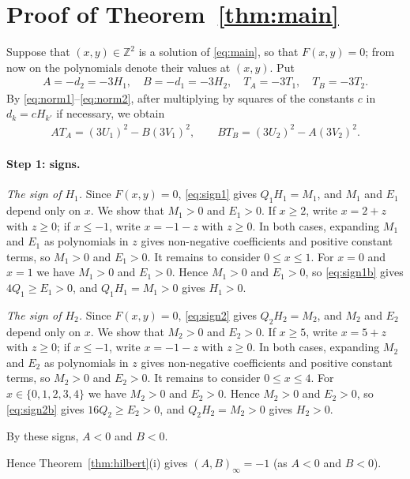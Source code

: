 \documentclass[11pt]{article}
\newcommand{\Z}{\mathbb{Z}}
\begin{document}
\section{Proof of Theorem~\ref{thm:main}}

Suppose that $(x,y)\in\Z^2$ is a solution of \eqref{eq:main}, so that $F(x,y)=0$; from now on the polynomials denote their values at $(x,y)$. Put
\begin{gather*}
A=-d_{2}=-3H_{1},\quad B=-d_{1}=-3H_{2},\quad T_A=-3T_{1},\quad T_B=-3T_{2}.
\end{gather*}
By \eqref{eq:norm1}--\eqref{eq:norm2}, after multiplying by squares of the constants $c$ in $d_k=cH_{k'}$ if necessary, we obtain
\begin{align}
AT_A=(3U_{1})^2-B(3V_{1})^2,\qquad BT_B=(3U_{2})^2-A(3V_{2})^2.\label{eq:AB}
\end{align}

\paragraph{Step 1: signs.} \emph{The sign of $H_{1}$.} Since $F(x,y)=0$, \eqref{eq:sign1} gives $Q_{1}H_{1}=M_{1}$, and $M_{1}$ and $E_{1}$ depend only on $x$. We show that $M_{1}>0$ and $E_{1}>0$. If $x\geq2$, write $x=2+z$ with $z\geq0$; if $x\leq-1$, write $x=-1-z$ with $z\geq0$. In both cases, expanding $M_{1}$ and $E_{1}$ as polynomials in $z$ gives non-negative coefficients and positive constant terms, so $M_{1}>0$ and $E_{1}>0$. It remains to consider $0\leq x\leq1$. For $x=0$ and $x=1$ we have $M_{1}>0$ and $E_{1}>0$. Hence $M_{1}>0$ and $E_{1}>0$, so \eqref{eq:sign1b} gives $4Q_{1}\geq E_{1}>0$, and $Q_{1}H_{1}=M_{1}>0$ gives $H_{1}>0$.

\emph{The sign of $H_{2}$.} Since $F(x,y)=0$, \eqref{eq:sign2} gives $Q_{2}H_{2}=M_{2}$, and $M_{2}$ and $E_{2}$ depend only on $x$. We show that $M_{2}>0$ and $E_{2}>0$. If $x\geq5$, write $x=5+z$ with $z\geq0$; if $x\leq-1$, write $x=-1-z$ with $z\geq0$. In both cases, expanding $M_{2}$ and $E_{2}$ as polynomials in $z$ gives non-negative coefficients and positive constant terms, so $M_{2}>0$ and $E_{2}>0$. It remains to consider $0\leq x\leq4$. For $x\in\{0,\allowbreak 1,\allowbreak 2,\allowbreak 3,\allowbreak 4\}$ we have $M_{2}>0$ and $E_{2}>0$. Hence $M_{2}>0$ and $E_{2}>0$, so \eqref{eq:sign2b} gives $16Q_{2}\geq E_{2}>0$, and $Q_{2}H_{2}=M_{2}>0$ gives $H_{2}>0$.

By these signs, $A<0$ and $B<0$.

Hence Theorem~\ref{thm:hilbert}(i) gives $(A,B)_\infty=-1$ (as $A<0$ and $B<0$).
\end{document}
